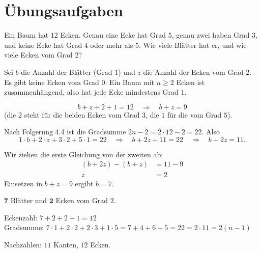 \section{Übungsaufgaben}

\begin{aufgabe}
Ein Baum hat $12$ Ecken. Genau eine Ecke hat Grad $5$, genau zwei haben Grad $3$, und keine Ecke hat Grad $4$ oder mehr als $5$. Wie viele Blätter hat er, und wie viele Ecken vom Grad $2$?

\loesung
{}
Sei $b$ die Anzahl der Blätter (Grad $1$) und $z$ die Anzahl der Ecken vom Grad $2$. Es gibt keine Ecken vom Grad $0$: Ein Baum mit $n \ge 2$ Ecken ist zusammenhängend, also hat jede Ecke mindestens Grad $1$.

\[ b + z + 2 + 1 = 12 \quad\Longrightarrow\quad b + z = 9 \]
(die $2$ steht für die beiden Ecken vom Grad $3$, die $1$ für die vom Grad $5$).

Nach Folgerung 4.4 ist die Gradsumme $2n - 2 = 2 \cdot 12 - 2 = 22$. Also
\[ 1 \cdot b + 2 \cdot z + 3 \cdot 2 + 5 \cdot 1 = 22 \quad\Longrightarrow\quad b + 2z + 11 = 22 \quad\Longrightarrow\quad b + 2z = 11 . \]

Wir ziehen die erste Gleichung von der zweiten ab:
\begin{align*}
(b + 2z) - (b + z) &= 11 - 9\\
z &= 2
\end{align*}
Einsetzen in $b + z = 9$ ergibt $b = 7$.

$\mathbf{7}$ Blätter und $\mathbf{2}$ Ecken vom Grad $2$.

Eckenzahl: $7 + 2 + 2 + 1 = 12$ \checkmark\\
Gradsumme: $7\cdot 1 + 2\cdot 2 + 2\cdot 3 + 1 \cdot 5 = 7 + 4 + 6 + 5 = 22 = 2 \cdot 11 = 2(n-1)$ \checkmark

\begin{center}
\end{center}
Nachzählen: $11$ Kanten, $12$ Ecken. \checkmark
\end{aufgabe}

